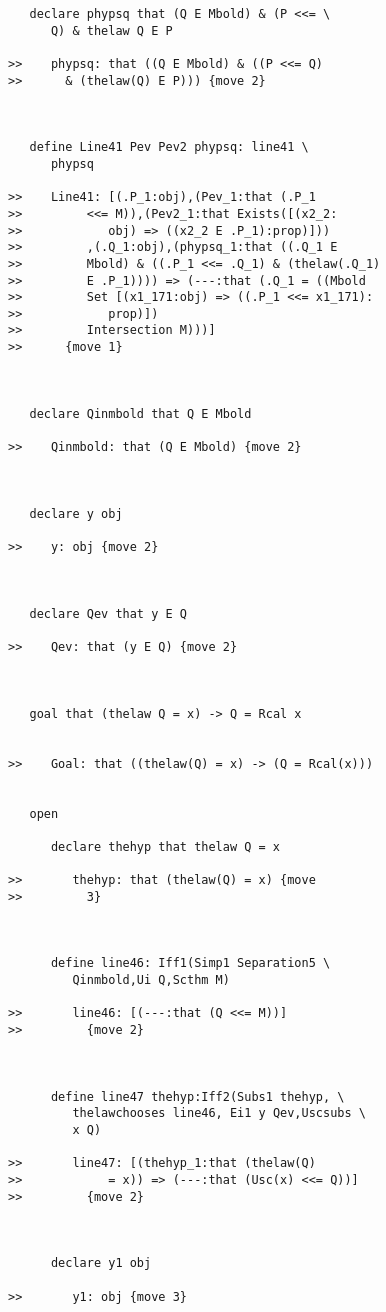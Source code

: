 \documentclass[12pt]{article}
\begin{document}
\begin{verbatim}
   declare phypsq that (Q E Mbold) & (P <<= \
      Q) & thelaw Q E P

>>    phypsq: that ((Q E Mbold) & ((P <<= Q)
>>      & (thelaw(Q) E P))) {move 2}



   define Line41 Pev Pev2 phypsq: line41 \
      phypsq

>>    Line41: [(.P_1:obj),(Pev_1:that (.P_1
>>         <<= M)),(Pev2_1:that Exists([(x2_2:
>>            obj) => ((x2_2 E .P_1):prop)]))
>>         ,(.Q_1:obj),(phypsq_1:that ((.Q_1 E
>>         Mbold) & ((.P_1 <<= .Q_1) & (thelaw(.Q_1)
>>         E .P_1)))) => (---:that (.Q_1 = ((Mbold
>>         Set [(x1_171:obj) => ((.P_1 <<= x1_171):
>>            prop)])
>>         Intersection M)))]
>>      {move 1}



   declare Qinmbold that Q E Mbold

>>    Qinmbold: that (Q E Mbold) {move 2}



   declare y obj

>>    y: obj {move 2}



   declare Qev that y E Q

>>    Qev: that (y E Q) {move 2}



   goal that (thelaw Q = x) -> Q = Rcal x


>>    Goal: that ((thelaw(Q) = x) -> (Q = Rcal(x)))


   open

      declare thehyp that thelaw Q = x

>>       thehyp: that (thelaw(Q) = x) {move
>>         3}



      define line46: Iff1(Simp1 Separation5 \
         Qinmbold,Ui Q,Scthm M)

>>       line46: [(---:that (Q <<= M))]
>>         {move 2}



      define line47 thehyp:Iff2(Subs1 thehyp, \
         thelawchooses line46, Ei1 y Qev,Uscsubs \
         x Q)

>>       line47: [(thehyp_1:that (thelaw(Q)
>>            = x)) => (---:that (Usc(x) <<= Q))]
>>         {move 2}



      declare y1 obj

>>       y1: obj {move 3}




\end{verbatim}
\end{document}
